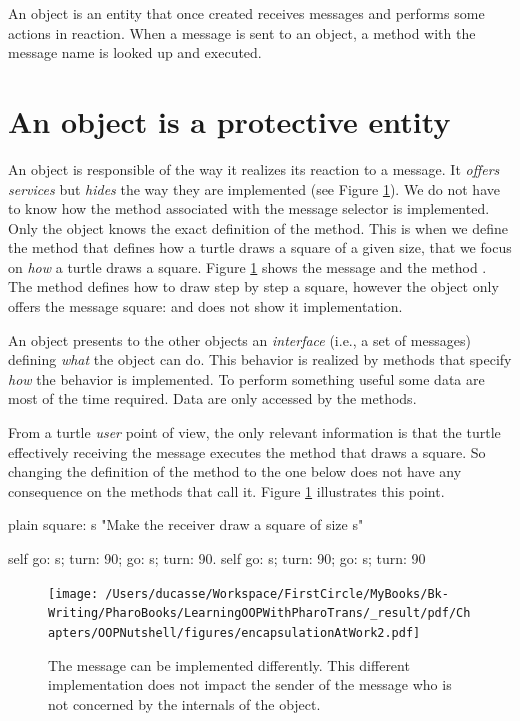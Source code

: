 \documentclass[10pt,twoside,english]{_support/latex/sbabook/sbabook}
\begin{document}
\begin{coffee}
An object is an entity that once created receives messages and performs some actions in reaction. When a message is sent to an object, a method with the message name is looked up and executed.
\end{coffee}
\section{An object is a protective entity}
An object is responsible of the way it realizes its reaction to a message.  It \textit{offers services} but \textit{hides} the way they are implemented (see Figure \ref{fig:encapsulationAtWork2}). We do not have to know how the method associated with the message selector is implemented.  Only the object knows the exact definition of the method.  This is when we define the method  that defines how a turtle draws a square of a given size, that we focus on \textit{how} a turtle draws a square. Figure \ref{fig:encapsulationAtWork2} shows the message and the method . The method  defines how to draw step by step a square, however the object only offers the message square: and does not show it implementation.

\begin{important}
An object presents to the other objects an \textit{interface} (i.e., a set of messages) defining \textit{what} the object can do. This behavior is realized by methods that specify \textit{how} the behavior is implemented. To perform something useful some data are most of the time required. Data are only accessed by the methods.
\end{important}

From a turtle \textit{user} point of view, the only relevant information is that the turtle effectively receiving the message  executes the method that draws a square. So changing the definition of the  method  to the one below does not have any consequence on the methods that call it. Figure \ref{fig:encapsulationAtWork2} illustrates this point.

\begin{displaycode}{plain}
square: s
   "Make the receiver draw a square of size s"

   self go: s; turn: 90; go: s; turn: 90.
   self go: s; turn: 90; go: s; turn: 90
\end{displaycode}


\begin{figure}

\begin{center}
\texttt{[image: /Users/ducasse/Workspace/FirstCircle/MyBooks/Bk-Writing/PharoBooks/LearningOOPWithPharoTrans/\_result/pdf/Chapters/OOPNutshell/figures/encapsulationAtWork2.pdf]}\caption{The message  can be implemented differently. This different implementation does not impact the sender of the message who is not concerned by the internals of the object.\label{fig:encapsulationAtWork2}}\end{center}
\end{figure}
\end{document}
